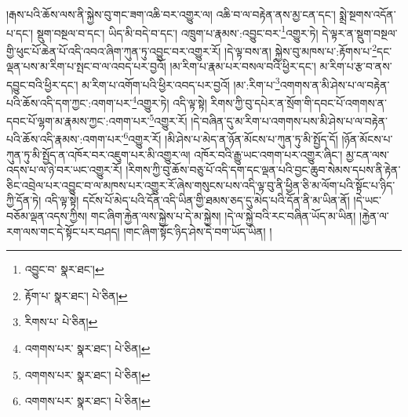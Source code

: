 །རྒས་པའི་ཆོས་ལས་ནི་སྐྱེས་བུ་གང་ཟག་འཆི་བར་འགྱུར་ལ། འཆི་བ་ལ་བརྟེན་ནས་མྱ་ངན་དང་། སྨྲེ་སྔགས་འདོན་པ་དང་། སྡུག་བསྔལ་བ་དང་། ཡིད་མི་བདེ་བ་དང་། འཁྲུག་པ་རྣམས་:འབྱུང་བར་\footnote{འབྱུང་བ་  སྣར་ཐང་། }འགྱུར་ཏེ། དེ་ལྟར་ན་སྡུག་བསྔལ་གྱི་ཕུང་པོ་ཆེན་པོ་འདི་འབའ་ཞིག་ཀུན་ཏུ་འབྱུང་བར་འགྱུར་རོ། །དེ་ལྟ་བས་ན། སྐྱེས་བུ་མཁས་པ་:རྟོགས་པ་\footnote{རྟོག་པ་  སྣར་ཐང་།  པེ་ཅིན། }དང་ལྡན་པས་མ་རིག་པ་སྤང་བ་ལ་འབད་པར་བྱའོ། །མ་རིག་པ་རྣམ་པར་བསལ་བའི་ཕྱིར་དང་། མ་རིག་པ་རྩ་བ་ནས་དབྱུང་བའི་ཕྱིར་དང་། མ་རིག་པ་འགོག་པའི་ཕྱིར་འབད་པར་བྱའོ། །མ་:རིག་པ་\footnote{རིགས་པ་  པེ་ཅིན། }འགགས་ན་མི་ཤེས་པ་ལ་བརྟེན་པའི་ཆོས་འདི་དག་ཀྱང་:འགག་པར་\footnote{འགགས་པར་  སྣར་ཐང་།  པེ་ཅིན། }འགྱུར་ཏེ། འདི་ལྟ་སྟེ། རིགས་ཀྱི་བུ་དཔེར་ན་སྲོག་གི་དབང་པོ་འགགས་ན་དབང་པོ་ལྷག་མ་རྣམས་ཀྱང་:འགག་པར་\footnote{འགགས་པར་  སྣར་ཐང་།  པེ་ཅིན། }འགྱུར་རོ། །དེ་བཞིན་དུ་མ་རིག་པ་འགགས་པས་མི་ཤེས་པ་ལ་བརྟེན་པའི་ཆོས་འདི་རྣམས་:འགག་པར་\footnote{འགགས་པར་  སྣར་ཐང་།  པེ་ཅིན། }འགྱུར་རོ། །མི་ཤེས་པ་མེད་ན་ཉོན་མོངས་པ་ཀུན་ཏུ་མི་སྤྱོད་དོ། །ཉོན་མོངས་པ་ཀུན་ཏུ་མི་སྤྱོད་ན་འཁོར་བར་འཇུག་པར་མི་འགྱུར་ལ། འཁོར་བའི་རྒྱུ་ཡང་འགག་པར་འགྱུར་ཞིང་། མྱ་ངན་ལས་འདས་པ་ལ་ཉེ་བར་ཡང་འགྱུར་རོ། །རིགས་ཀྱི་བུ་ཆོས་བཅུ་པོ་འདི་དག་དང་ལྡན་པའི་བྱང་ཆུབ་སེམས་དཔས་ནི་རྟེན་ཅིང་འབྲེལ་པར་འབྱུང་བ་ལ་མཁས་པར་འགྱུར་རོ་ཞེས་གསུངས་པས་འདི་ལྟ་བུ་ནི་ཕྱིན་ཅི་མ་ལོག་པའི་སྟོང་པ་ཉིད་ཀྱི་དོན་ཏེ། འདི་ལྟ་སྟེ། དངོས་པོ་མེད་པའི་དོན་འདི་ཡིན་གྱི་ཐམས་ཅད་དུ་མེད་པའི་དོན་ནི་མ་ཡིན་ནོ། །དེ་ཡང་བཅོམ་ལྡན་འདས་ཀྱིས། གང་ཞིག་རྐྱེན་ལས་སྐྱེས་པ་དེ་མ་སྐྱེས། །དེ་ལ་སྐྱེ་བའི་རང་བཞིན་ཡོད་མ་ཡིན། །རྐྱེན་ལ་རག་ལས་གང་དེ་སྟོང་པར་བཤད། །གང་ཞིག་སྟོང་ཉིད་ཤེས་དེ་བག་ཡོད་ཡིན། །
